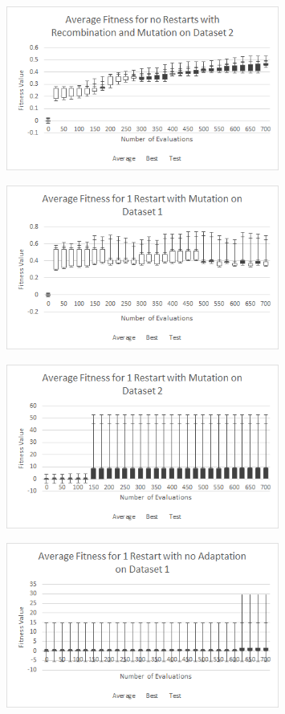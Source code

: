 \documentclass{article}
\begin{document}
\begin{figure}[h]
	\centering
	\includegraphics[width=0.8\textwidth]{res0adaptReMuDS2}
\end{figure}
\newpage
\begin{figure}[h]
	\centering
	\includegraphics[width=0.8\textwidth]{res1adaptMuDS1}
\end{figure}
\begin{figure}[h]
	\centering
	\includegraphics[width=0.8\textwidth]{res1adaptMuDS2}
\end{figure}
\newpage
\begin{figure}[h]
	\centering
	\includegraphics[width=0.8\textwidth]{res1adaptNoDS1}
\end{figure}
\end{document}
